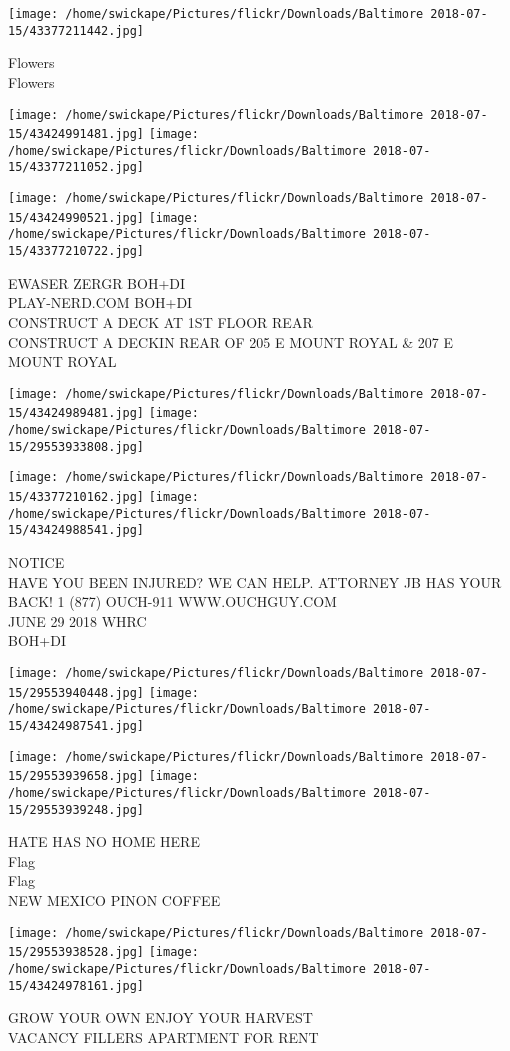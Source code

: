 \documentclass[10pt,letterpaper]{article}
\begin{document}
\vspace{0.25in}
\texttt{[image: /home/swickape/Pictures/flickr/Downloads/Baltimore 2018-07-15/43377211442.jpg]}

Flowers\\
Flowers
\pagebreak

\texttt{[image: /home/swickape/Pictures/flickr/Downloads/Baltimore 2018-07-15/43424991481.jpg]}
\texttt{[image: /home/swickape/Pictures/flickr/Downloads/Baltimore 2018-07-15/43377211052.jpg]}

\texttt{[image: /home/swickape/Pictures/flickr/Downloads/Baltimore 2018-07-15/43424990521.jpg]}
\texttt{[image: /home/swickape/Pictures/flickr/Downloads/Baltimore 2018-07-15/43377210722.jpg]}

EWASER ZERGR BOH+DI\\
PLAY{-}NERD.COM BOH+DI\\
CONSTRUCT A DECK AT 1ST FLOOR REAR\\
CONSTRUCT A DECKIN REAR OF 205 E MOUNT ROYAL \& 207 E MOUNT ROYAL
\pagebreak

\texttt{[image: /home/swickape/Pictures/flickr/Downloads/Baltimore 2018-07-15/43424989481.jpg]}
\texttt{[image: /home/swickape/Pictures/flickr/Downloads/Baltimore 2018-07-15/29553933808.jpg]}

\texttt{[image: /home/swickape/Pictures/flickr/Downloads/Baltimore 2018-07-15/43377210162.jpg]}
\texttt{[image: /home/swickape/Pictures/flickr/Downloads/Baltimore 2018-07-15/43424988541.jpg]}

NOTICE\\
HAVE YOU BEEN INJURED?  WE CAN HELP.  ATTORNEY JB HAS YOUR BACK!  1 (877) OUCH{-}911 WWW.OUCHGUY.COM\\
JUNE 29 2018 WHRC\\
BOH+DI
\pagebreak

\texttt{[image: /home/swickape/Pictures/flickr/Downloads/Baltimore 2018-07-15/29553940448.jpg]}
\texttt{[image: /home/swickape/Pictures/flickr/Downloads/Baltimore 2018-07-15/43424987541.jpg]}

\texttt{[image: /home/swickape/Pictures/flickr/Downloads/Baltimore 2018-07-15/29553939658.jpg]}
\texttt{[image: /home/swickape/Pictures/flickr/Downloads/Baltimore 2018-07-15/29553939248.jpg]}

HATE HAS NO HOME HERE\\
Flag\\
Flag\\
NEW MEXICO PINON COFFEE
\pagebreak

\texttt{[image: /home/swickape/Pictures/flickr/Downloads/Baltimore 2018-07-15/29553938528.jpg]}
\texttt{[image: /home/swickape/Pictures/flickr/Downloads/Baltimore 2018-07-15/43424978161.jpg]}

GROW YOUR OWN ENJOY YOUR HARVEST\\
VACANCY FILLERS APARTMENT FOR RENT
\pagebreak
\end{document}
